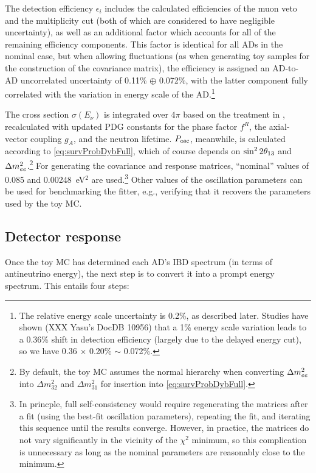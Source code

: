 \documentclass[../thesis.tex]{subfiles}
\begin{document}
The detection efficiency $\epsilon_i$ includes the calculated efficiencies of the muon veto and the multiplicity cut (both of which are considered to have negligible uncertainty), as well as an additional factor which accounts for all of the remaining efficiency components. This factor is identical for all ADs in the nominal case, but when allowing fluctuations (as when generating toy samples for the construction of the covariance matrix), the efficiency is assigned an AD-to-AD uncorrelated uncertainty of 0.11\% $\oplus$ 0.072\%, with the latter component fully correlated with the variation in energy scale of the AD.\footnote{The relative energy scale uncertainty is 0.2\%, as described later. Studies have shown (XXX Yasu's DocDB 10956) that a 1\% energy scale variation leads to a 0.36\% shift in detection efficiency (largely due to the delayed energy cut), so we have 0.36 $\times$ 0.20\% $\sim$ 0.072\%.}

The cross section $\sigma(E_\nu)$ is integrated over $4\pi$ based on the treatment in \cite{Vogel_1999}, recalculated with updated PDG constants for the phase factor $f^R$, the axial-vector coupling $g_A$, and the neutron lifetime. $P_\mathrm{osc}$, meanwhile, is calculated according to \autoref{eq:survProbDybFull}, which of course depends on $\sin^2 2\theta_{13}$ and $\Delta m^2_{ee}$.\footnote{By default, the toy MC assumes the normal hierarchy when converting $\Delta m^2_{ee}$ into $\Delta m^2_{32}$ and $\Delta m^2_{31}$ for insertion into \autoref{eq:survProbDybFull}.} For generating the covariance and response matrices, ``nominal'' values of 0.085 and 0.00248~eV$^2$ are used.\footnote{In princple, full self-consistency would require regenerating the matrices after a fit (using the best-fit oscillation parameters), repeating the fit, and iterating this sequence until the results converge. However, in practice, the matrices do not vary significantly in the vicinity of the $\chi^2$ minimum, so this complication is unnecessary as long as the nominal parameters are reasonably close to the minimum.} Other values of the oscillation parameters can be used for benchmarking the fitter, e.g., verifying that it recovers the parameters used by the toy MC.

\subsection{Detector response}
\label{sec:fitToyDetResponse}

Once the toy MC has determined each AD's IBD spectrum (in terms of antineutrino energy), the next step is to convert it into a prompt energy spectrum. This entails four steps:
\end{document}
